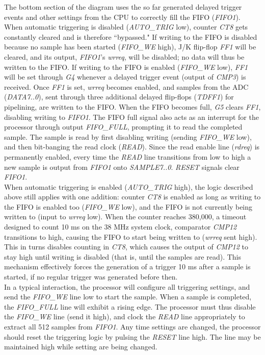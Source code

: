 \documentclass[titlepage]{scrartcl}
\begin{document}
	The bottom section of the diagram uses the so far generated delayed trigger events and other settings from the CPU to correctly fill the FIFO (\textit{FIFO1}). When automatic triggering is disabled (\textit{AUTO\_TRIG} low), counter \textit{CT8} gets constantly cleared and is therefore ``bypassed." If writing to the FIFO is disabled because no sample has been started (\textit{FIFO\_WE} high), J/K flip-flop \textit{FF1} will be cleared, and its output, \textit{FIFO1}'s \textit{wrreq}, will be disabled; no data will thus be written to the FIFO. If writing to the FIFO is enabled (\textit{FIFO\_WE} low), \textit{FF1} will be set through \textit{G4} whenever a delayed trigger event (output of \textit{CMP3}) is received. Once \textit{FF1} is set, \textit{wrreq} becomes enabled, and samples from the ADC (\textit{DATA7..0}), sent through three additional delayed flip-flops (\textit{TDFF1}) for pipelining, are written to the FIFO. When the FIFO becomes full, \textit{G5} clears \textit{FF1}, disabling writing to \textit{FIFO1}. The FIFO full signal also acts as an interrupt for the processor through output \textit{FIFO\_FULL}, prompting it to read the completed sample. The sample is read by first disabling writing (sending \textit{FIFO\_WE} low), and then bit-banging the read clock (\textit{READ}). Since the read enable line (\textit{rdreq}) is permanently enabled, every time the \textit{READ} line transitions from low to high a new sample is output from \textit{FIFO1} onto \textit{SAMPLE7..0}. \textit{RESET} signals clear \textit{FIFO1}.\\

	When automatic triggering is enabled (\textit{AUTO\_TRIG} high), the logic described above still applies with one addition: counter \textit{CT8} is enabled as long as writing to the FIFO is enabled too (\textit{FIFO\_WE} low), and the FIFO is not currently being written to (input to \textit{wrreq} low). When the counter reaches 380,000, a timeout designed to count 10 ms on the 38 MHz system clock, comparator \textit{CMP12} transitions to high, causing the FIFO to start being written to (\textit{wrreq} sent high). This in turns disables counting in \textit{CT8}, which causes the output of \textit{CMP12} to stay high until writing is disabled (that is, until the samples are read). This mechanism effectively forces the generation of a trigger 10 ms after a sample is started, if no regular trigger was generated before then.\\

	In a typical interaction, the processor will configure all triggering settings, and send the \textit{FIFO\_WE} line low to start the sample. When a sample is completed, the \textit{FIFO\_FULL} line will exhibit a rising edge. The processor must thus disable the \textit{FIFO\_WE} line (send it high), and clock the \textit{READ} line appropriately to extract all 512 samples from \textit{FIFO1}. Any time settings are changed, the processor should reset the triggering logic by pulsing the \textit{RESET} line high. The line may be maintained high while setting are being changed.\\
\end{document}
